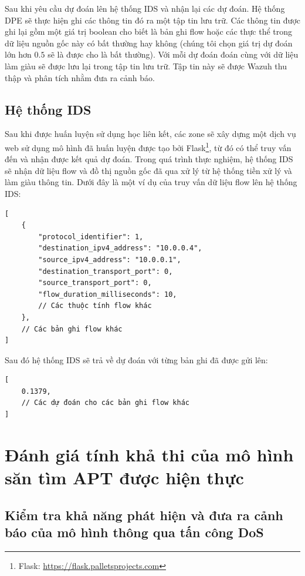 \bigbreak\noindent
Sau khi yêu cầu dự đoán lên hệ thống IDS và nhận lại các dự đoán. Hệ thống DPE sẽ thực hiện ghi các thông tin đó ra một tập tin lưu trữ. Các thông tin được ghi lại gồm một giá trị boolean cho biết là bản ghi flow hoặc các thực thể trong dữ liệu nguồn gốc này có bất thường hay không (chúng tôi chọn giá trị dự đoán lớn hơn $0.5$ sẽ là được cho là bất thường). Với mỗi dự đoán đoán cùng với dữ liệu làm giàu sẽ được lưu lại trong tập tin lưu trữ. Tập tin này sẽ được Wazuh thu thập và phân tích nhằm đưa ra cảnh báo.

\subsection{Hệ thống IDS}

Sau khi được huấn luyện sử dụng học liên kết, các zone sẽ xây dựng một dịch vụ web sử dụng mô hình đã huấn luyện được tạo bởi  Flask\footnote{Flask: \url{https://flask.palletsprojects.com}}, từ đó có thể truy vấn đến và nhận được kết quả dự đoán. Trong quá trình thực nghiệm, hệ thống IDS sẽ nhận dữ liệu flow và đồ thị nguồn gốc đã qua xử lý từ hệ thống tiền xử lý và làm giàu thông tin. Dưới đây là một ví dụ của truy vấn dữ liệu flow lên hệ thống IDS:

\begin{verbatim}
[
    {
        "protocol_identifier": 1,
        "destination_ipv4_address": "10.0.0.4",
        "source_ipv4_address": "10.0.0.1",
        "destination_transport_port": 0,
        "source_transport_port": 0,
        "flow_duration_milliseconds": 10,
        // Các thuộc tính flow khác
    },
    // Các bản ghi flow khác
]
\end{verbatim}

\bigbreak\noindent
Sau đó hệ thống IDS sẽ trả về dự đoán với từng bản ghi đã được gửi lên:

\begin{verbatim}
[
    0.1379,
    // Các dự đoán cho các bản ghi flow khác
]
\end{verbatim}


\section{Đánh giá tính khả thi của mô hình săn tìm APT được hiện thực}

\subsection{Kiểm tra khả năng phát hiện và đưa ra cảnh báo của mô hình thông qua tấn công DoS}

